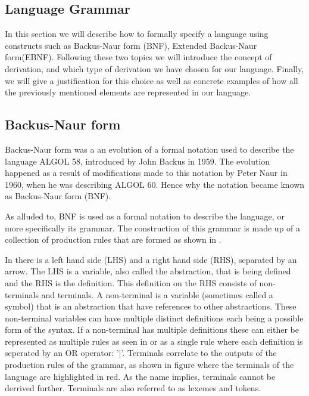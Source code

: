 \subsection{Language Grammar} \label{langGram}

In this section we will describe how to formally specify a language using constructs such as Backus-Naur form (BNF), Extended Backus-Naur form(EBNF).
Following these two topics we will introduce the concept of derivation, and which type of derivation we have chosen for our language.
Finally, we will give a justification for this choice as well as concrete examples of how all the previously mentioned elements are represented in our language.

\subsection{Backus-Naur form}

Backus-Naur form was a an evolution of a formal notation used to describe the language ALGOL 58, introduced by John Backus in 1959. The evolution happened as a result of modifications
made to this notation by Peter Naur in 1960, when he was describing ALGOL 60. Hence why the notation became known as Backus-Naur form (BNF)\cite{sebesta_concepts_2016}.

As alluded to, BNF is used as a formal notation to describe the language, or more specifically its grammar. 
The construction of this grammar is made up of a collection of production rules that are formed as shown in .


In  there is a left hand side (LHS) and a right hand side (RHS), separated by an arrow. The LHS is a variable, also called the abstraction, that is being defined and the RHS is the definition.
This definition on the RHS consists of non-terminals and terminals. A non-terminal is a variable (sometimes called a symbol) that is an abstraction that have references to other abstractions. 
These non-terminal variables can have multiple distinct definitions each being a possible form of the syntax. 
If a non-terminal has multiple definitions these can either be represented as multiple rules as seen in  or as a single rule where each definition is seperated by an OR operator: '|'. 
Terminals correlate to the outputs of the production rules of the grammar, as shown in figure  where the terminals of the language are highlighted in red. 
As the name implies, terminals cannot be derrived further. Terminals are also referred to as lexemes and tokens\cite{sebesta_concepts_2016}. 

